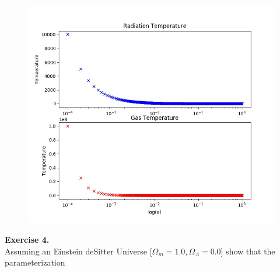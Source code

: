 \documentclass[a4paper]{article}
\begin{document}
\begin{figure}[h]
\centering
\includegraphics[scale=.35]{exercise3-1}

\end{figure}

\clearpage

\noindent\textbf{Exercise 4.}\\
Assuming an Einstein deSitter Universe [$\Omega_m = 1.0, \Omega_{\Lambda} = 0.0$] show that the parameterization
\end{document}
